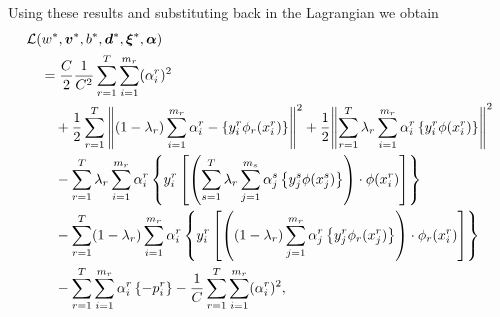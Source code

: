 Using these results and substituting back in the Lagrangian we obtain
\begin{equation}\nonumber
    \begin{aligned}
         &\mathcal{L}({{w}}^*, {\bm{v}}^*, {b}^*, {\bm{d}}^*, {\bm{\xi}}^*, \bm{\alpha}) \\
        &\quad= \frac{C}{2} \frac{1}{C^2} \sum_{r=1}^T \sum_{i=1}^{m_r} (\alpha_i^r)^2  \\
        &\qquad +  \frac{1}{2} \sum_{r= 1}^T{\left\lVert (1 - \lambda_r) \sum_{i=1}^{m_r}  {\alpha_i^r} - \left\lbrace y_i^r \phi_r({x}_i^r) \right\rbrace\right\rVert^2} + \frac{1}{2} {\left\lVert\sum_{r= 1}^T \lambda_r \sum_{i=1}^{m_r} {\alpha_i^r} \left\lbrace y_i^r \phi({x}_i^r) \right\rbrace\right\rVert}^2 \\
        &\qquad - \sum_{r= 1}^T \lambda_r \sum_{i=1}^{m_r} \alpha_i^r \left\lbrace y_{i}^r \left[ \left(\sum_{s= 1}^T \lambda_r \sum_{j=1}^{m_s} {\alpha_j^s} \left\lbrace y_j^s \phi({x}_j^s) \right\rbrace \right) \cdot \phi({x}_{i}^r) \right]  \right\rbrace \\
        &\qquad -  \sum_{r= 1}^T (1-\lambda_r) \sum_{i=1}^{m_r} \alpha_i^r \left\lbrace y_{i}^r \left[  \left((1-\lambda_r) \sum_{j=1}^{m_r} {\alpha_j^r} \left\lbrace y_j^r \phi_r({x}_j^r) \right\rbrace \right) \cdot \phi_r({x}_{i}^r)  \right]  \right\rbrace \\
        &\qquad -  \sum_{r= 1}^T \sum_{i=1}^{m_r} \alpha_i^r \left\lbrace - p_{i}^r  \right\rbrace - \frac{1}{C} \sum_{r=1}^T \sum_{i=1}^{m_r} (\alpha_i^r)^2  ,\\
    \end{aligned}
\end{equation}
